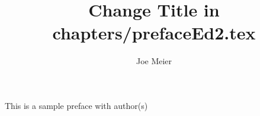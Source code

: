 \documentclass[output=paper]{langscibook}
\title{Change Title in chapters/prefaceEd2.tex}
\author{%
 Joe Meier  \affiliation{University of Eden}  
}
\begin{document}
\noindent This is a sample preface with author(s)

{\sloppy
\printbibliography[heading=subbibliography,notkeyword=this]
}
\end{document}
